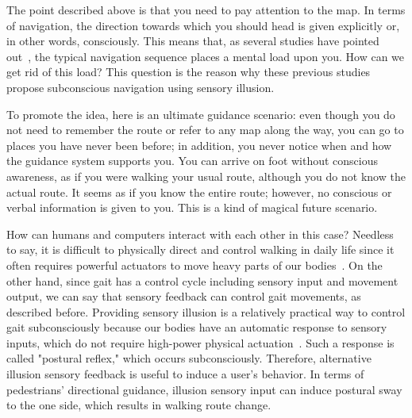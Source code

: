 \documentclass{sigchi}
\begin{document}
The point described above is that you need to pay attention to the map. In terms of navigation, the direction towards which you should head is given explicitly or, in other words, consciously.
This means that, as several studies have pointed out~\cite{Ghaem1997,PSYP:PSYP1043,1276842},
 the typical navigation sequence places a mental load upon you. How can we get rid of this load? This question is the reason why these previous studies propose subconscious navigation using sensory illusion\cite{Tanikawa2012,%
TJP:TJP931,TJP:TJP1033,7460029,7989977,BENT2000157,Britton1993,campbell2000headset,campbell1998multimodal}.%

To promote the idea, here is an ultimate guidance scenario: even though you do not need to remember the route or refer to any map along the way, you can go to places you have never been before; in addition, you never notice when and how the guidance system supports you. You can arrive on foot without conscious awareness, as if you were walking your usual route, although you do not know the actual route. It seems as if you know the entire route; however, no conscious or verbal information is given to you. This is a kind of magical future scenario.

How can humans and computers interact with each other in this case? Needless to say, it is difficult to physically direct and control walking in daily life since it often requires powerful actuators to move heavy parts of our bodies~\cite{doi:10.3109/03093648709078194,DOMINGO2009464}. On the other hand, since gait has a control cycle including sensory input and movement output, we can say that sensory feedback can control gait movements, as described before. Providing sensory illusion is a relatively practical way to control gait subconsciously because our bodies have an automatic response to sensory inputs, which do not require high-power physical actuation~\cite{Watanabe2010,Watanabe:2005:SII:1152399.1152406,Jones2008,Imamura:2011:HHW:2048259.2048265, Turchet2015, 7460029}. Such a response is called "postural reflex," which occurs subconsciously. Therefore, alternative illusion sensory feedback is useful to induce a user's behavior. In terms of pedestrians' directional guidance, illusion sensory input can induce postural sway to the one side, which results in walking route change. 
\end{document}
